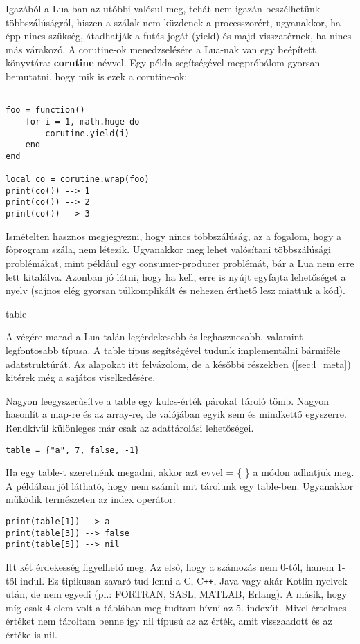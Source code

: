 Igazából a Lua-ban az utóbbi valósul meg, tehát nem igazán beszélhetünk többszálúságról, hiszen a szálak nem küzdenek a processzorért, ugyanakkor, ha épp nincs szükség, átadhatják a futás jogát (yield) és majd visszatérnek, ha nincs más várakozó. A corutine-ok menedzselésére a Lua-nak van egy beépített könyvtára: \textbf{corutine} névvel. Egy példa segítségével megpróbálom gyorsan bemutatni, hogy mik is ezek a corutine-ok:
\scriptsize
\begin{lstlisting}

foo = function()
	for i = 1, math.huge do
		corutine.yield(i)
	end
end

local co = corutine.wrap(foo)
print(co()) --> 1
print(co()) --> 2
print(co()) --> 3

\end{lstlisting}
\normalsize
Ismételten hasznos megjegyezni, hogy nincs többszálúság, az a fogalom, hogy a főprogram szála, nem létezik. Ugyanakkor meg lehet valósítani többszálúsági problémákat, mint például egy consumer-producer problémát, bár a Lua nem erre lett kitalálva. Azonban jó látni, hogy ha kell, erre is nyújt egyfajta lehetőséget a nyelv (sajnos elég gyorsan túlkomplikált és nehezen érthető lesz miattuk a kód).

\bigskip

\Large table \normalsize

\bigskip

A végére marad a Lua talán legérdekesebb és leghasznosabb, valamint legfontosabb típusa. A table típus segítségével tudunk implementálni bármiféle adatstruktúrát. Az alapokat itt felvázolom, de a későbbi részekben (\ref{sec:l_meta}) kitérek még a sajátos viselkedésére. 

Nagyon leegyszerűsítve a table egy kulcs-érték párokat tároló tömb. Nagyon hasonlít a map-re és az array-re, de valójában egyik sem és mindkettő egyszerre. Rendkívül különleges már csak az adattárolási lehetőségei. 
\scriptsize
\begin{lstlisting}
table = {"a", 7, false, -1}
\end{lstlisting}
\normalsize
Ha egy table-t szeretnénk megadni, akkor azt evvel = \{ \} a módon adhatjuk meg. A példában jól látható, hogy nem számít mit tárolunk egy table-ben. Ugyanakkor működik természeten az index operátor:
\scriptsize
\begin{lstlisting}
print(table[1]) --> a
print(table[3]) --> false
print(table[5]) --> nil
\end{lstlisting}
\normalsize
Itt két érdekesség figyelhető meg. Az első, hogy a számozás nem 0-tól, hanem 1-től indul. Ez tipikusan zavaró tud lenni a C, C\verb|++|, Java vagy akár Kotlin nyelvek után, de nem egyedi (pl.: FORTRAN, SASL, MATLAB, Erlang). A másik, hogy míg csak 4 elem volt a táblában meg tudtam hívni az 5. indexűt. Mivel értelmes értéket nem tároltam benne így nil típusú az az érték, amit visszaadott és az értéke is nil.

